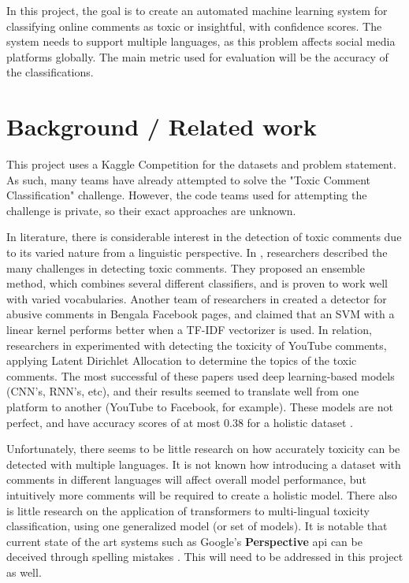 \documentclass{article}
\begin{document}
In this project, the goal is to create an automated machine learning system for classifying online comments as toxic or insightful, with confidence scores. The system needs to support multiple languages, as this problem affects social media platforms globally. The main metric used for evaluation will be the accuracy of the classifications.

\section{Background / Related work}

This project uses a Kaggle Competition \cite{kaggle_competition} for the datasets and problem statement. As such, many teams have already attempted to solve the "Toxic Comment Classification" challenge. However, the code teams used for attempting the challenge is private, so their exact approaches are unknown.

In literature, there is considerable interest in the detection of toxic comments \cite{almerekhi2019detecting} due to its varied nature from a linguistic perspective. In \cite{vanaken2018challenges}, researchers described the many challenges in detecting toxic comments. They proposed an ensemble method, which combines several different classifiers, and is proven to work well with varied vocabularies. Another team of researchers in \cite{8660863} created a detector for abusive comments in Bengala Facebook pages, and claimed that an SVM with a linear kernel performs better when a TF-IDF vectorizer is used. In relation, researchers in \cite{obadimu2019identifying} experimented with detecting the toxicity of YouTube comments, applying Latent Dirichlet Allocation to determine the topics of the toxic comments. The most successful of these papers used deep learning-based models \cite{deep_learning_approaches} (CNN's, RNN's, etc), and their results seemed to translate well from one platform to another (YouTube to Facebook, for example). These models are not perfect, and have accuracy scores of at most 0.38 for a holistic dataset \cite{deep_learning_approaches}.

Unfortunately, there seems to be little research on how accurately toxicity can be detected with multiple languages. It is not known how introducing a dataset with comments in different languages will affect overall model performance, but intuitively more comments will be required to create a holistic model. There also is little research on the application of transformers to multi-lingual toxicity classification, using one generalized model (or set of models). It is notable that current state of the art systems such as Google's \textbf{Perspective} api can be deceived through spelling mistakes \cite{hosseini2017deceiving}. This will need to be addressed in this project as well.
\end{document}
